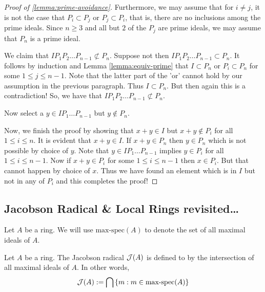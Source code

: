 \begin{proof}[Proof of \ref{lemma:prime-avoidance}]
    Furthermore, we may assume that for $i\ne j$, it is not the case that $P_i \subset P_j$ or $P_j \subset P_i$, that is, there are no inclusions among the prime ideals. Since $n\ge 3$ and all but $2$ of the $P_j$ are prime ideals, we may assume that $P_n$ is a prime ideal.
    
    We claim that $IP_1 P_2 \ldots P_{n-1} \not\subset P_n$. Suppose not then $I P_1 P_2 \ldots P_{n-1} \subset P_n$. It follows by induction and Lemma \ref{lemma:equiv-prime} that $I \subset P_n$ or $P_i \subset P_n$ for some $1\le j \le n-1$. Note that the latter part of the 'or' cannot hold by our assumption in the previous paragraph. Thus $I \subset P_n$. But then again this is a contradiction! So, we have that $IP_1 P_2 \ldots P_{n-1} \not\subset P_n$.

    Now select a $y\in IP_1 \ldots P_{n-1}$ but $y\not \in P_n$.

    Now, we finish the proof by showing that $x+y \in I$ but $x+y \not \in P_i$ for all $1\le i \le n$. It is evident that $x+y \in I$. If $x+y\in P_n$ then $y\in P_n$ which is not possible by choice of $y$. Note that $y\in IP_1\ldots P_{n-1}$ implies $y\in P_i$ for all $1\le i\le n-1$. Now if $x+y \in P_i$ for some $1\le i \le n-1$ then $x \in P_i$. But that cannot happen by choice of $x$. Thus we have found an element which is in $I$ but not in any of $P_i$ and this completes the proof!

\end{proof}

\subsection{Jacobson Radical \& Local Rings revisited\ldots }

\begin{notation}
    Let $A$ be a ring. We will use $\text{max-spec} (A)$ to denote the set of all maximal ideals of $A$.
\end{notation}


\begin{definition}
    Let $A$ be a ring. The Jacobson radical ${\cal J} (A)$ is defined to by the intersection of all maximal ideals of $A$. In other words,
    \begin{equation*}
	{\cal J} (A) := \bigcap \left\{ m : m \in \text{max-spec} (A) \right\}
    \end{equation*}
    \label{def:Jacobson}
\end{definition}

